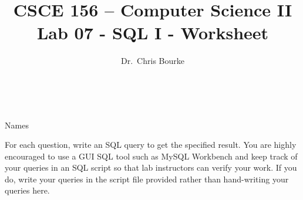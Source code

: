 \documentclass[12pt]{exam}
\title{CSCE 156 -- Computer Science II \\
{\large Lab 07 - SQL I - Worksheet}}
\author{Dr.\ Chris Bourke}
\date{~}
\begin{document}
\maketitle

{\Large Names \underline{\hspace*{5cm}}}

For each question, write an SQL query to get the specified result.  You are highly 
encouraged to use a GUI SQL tool such as MySQL Workbench and keep track of your 
queries in an SQL script so that lab instructors can verify your work.  If you do, 
write your queries in the script file provided rather than hand-writing your queries 
here.

\end{document}
